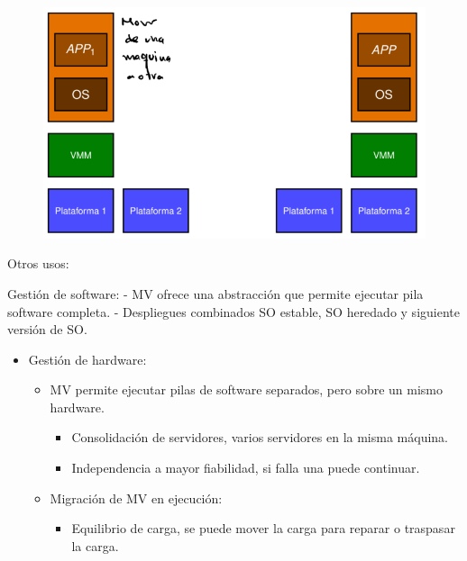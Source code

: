 \documentclass[12pt, twoside, openright]{report} %
\begin{document}
\begin{itemize}
\begin{figure}[H]
        {\includegraphics[scale=.3]{Untitled 35.png}}
      \end{figure}
    \end{itemize}

    Otros usos:

    Gestión de software: - MV ofrece una abstracción que permite
    ejecutar pila software completa. - Despliegues combinados SO
    estable, SO heredado y siguiente versión de SO.

    \begin{itemize}
    
    \item
      Gestión de hardware:

      \begin{itemize}
      
      \item
        MV permite ejecutar pilas de software separados, pero sobre un
        mismo hardware.

        \begin{itemize}
        
        \item
          Consolidación de servidores, varios servidores en la misma
          máquina.
        \item
          Independencia a mayor fiabilidad, si falla una puede
          continuar.
        \end{itemize}
      \item
        Migración de MV en ejecución:

        \begin{itemize}
        
        \item
          Equilibrio de carga, se puede mover la carga para reparar o
          traspasar la carga.
        \end{itemize}
      \end{itemize}
    \end{itemize}
\end{document}
